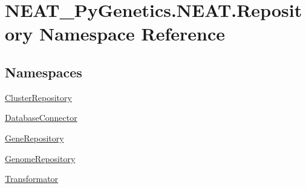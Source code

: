 \hypertarget{namespaceNEAT__PyGenetics_1_1NEAT_1_1Repository}{}\section{N\+E\+A\+T\+\_\+\+Py\+Genetics.\+N\+E\+A\+T.\+Repository Namespace Reference}
\label{namespaceNEAT__PyGenetics_1_1NEAT_1_1Repository}
\subsection*{Namespaces}
\begin{DoxyCompactItemize}
\item 
 \hyperlink{namespaceNEAT__PyGenetics_1_1NEAT_1_1Repository_1_1ClusterRepository}{Cluster\+Repository}
\item 
 \hyperlink{namespaceNEAT__PyGenetics_1_1NEAT_1_1Repository_1_1DatabaseConnector}{Database\+Connector}
\item 
 \hyperlink{namespaceNEAT__PyGenetics_1_1NEAT_1_1Repository_1_1GeneRepository}{Gene\+Repository}
\item 
 \hyperlink{namespaceNEAT__PyGenetics_1_1NEAT_1_1Repository_1_1GenomeRepository}{Genome\+Repository}
\item 
 \hyperlink{namespaceNEAT__PyGenetics_1_1NEAT_1_1Repository_1_1Transformator}{Transformator}
\end{DoxyCompactItemize}
